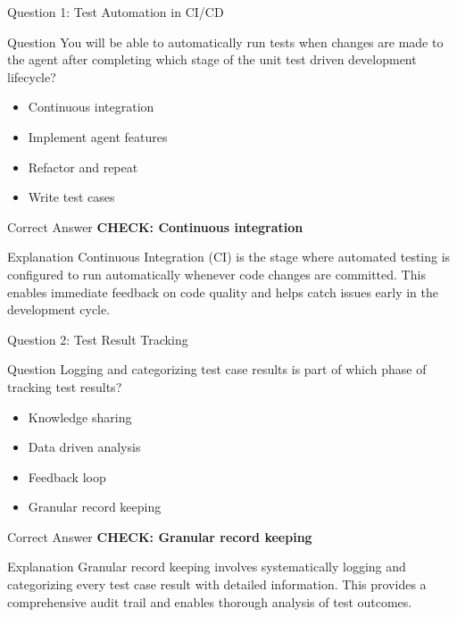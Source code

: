 \documentclass[aspectratio=169]{beamer}
\begin{document}
\begin{frame}{Question 1: Test Automation in CI/CD}
  \begin{block}{Question}
    You will be able to automatically run tests when changes are made to the agent after completing which stage of the unit test driven development lifecycle?
  \end{block}
  \begin{itemize}
    \item Continuous integration
    \item Implement agent features
    \item Refactor and repeat
    \item Write test cases
  \end{itemize}
  
  \begin{alertblock}{Correct Answer}
    \textcolor{GoogleGreen}{\textbf{CHECK: Continuous integration}}
  \end{alertblock}
  
  
  \begin{block}{Explanation}
    \small
    Continuous Integration (CI) is the stage where automated testing is configured to run automatically whenever code changes are committed. This enables immediate feedback on code quality and helps catch issues early in the development cycle.
  \end{block}
\end{frame}

\begin{frame}{Question 2: Test Result Tracking}
  \begin{block}{Question}
    Logging and categorizing test case results is part of which phase of tracking test results?
  \end{block}
  
  
  
  \begin{itemize}
    \item Knowledge sharing
    \item Data driven analysis
    \item Feedback loop
    \item Granular record keeping
  \end{itemize}
  
  
  
  \begin{alertblock}{Correct Answer}
    \textcolor{GoogleGreen}{\textbf{CHECK: Granular record keeping}}
  \end{alertblock}
  
  \vspace{0.2cm}
  
  \begin{block}{Explanation}
    \small
    Granular record keeping involves systematically logging and categorizing every test case result with detailed information. This provides a comprehensive audit trail and enables thorough analysis of test outcomes.
  \end{block}
\end{frame}
\end{document}
